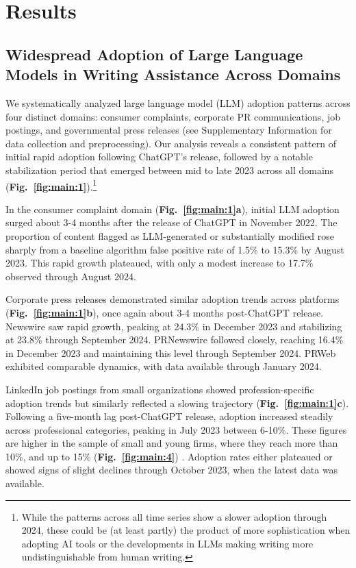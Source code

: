

\section*{Results}
\label{sec:Results}

\subsection*{Widespread Adoption of Large Language Models in Writing Assistance Across Domains}



We systematically analyzed large language model (LLM) adoption patterns across four distinct domains: consumer complaints, corporate PR communications, job postings, and governmental press releases (see Supplementary Information for data collection and preprocessing). Our analysis reveals a consistent pattern of initial rapid adoption following ChatGPT's release, followed by a notable stabilization period that emerged between mid to late 2023 across all domains (\textbf{Fig.~\ref{fig:main:1}}).\footnote{While the patterns across all time series show a slower adoption through 2024, these could be (at least partly) the product of more sophistication when adopting AI tools or the developments in LLMs making writing more undistinguishable from human writing.}



In the consumer complaint domain (\textbf{Fig.~\ref{fig:main:1}a}), initial LLM adoption surged about 3-4 months after the release of ChatGPT in November 2022. The proportion of content flagged as LLM-generated or substantially modified rose sharply from a baseline algorithm false positive rate of 1.5\% to 15.3\% by August 2023. This rapid growth plateaued, with only a modest increase to 17.7\% observed through August 2024.

Corporate press releases demonstrated similar adoption trends across platforms (\textbf{Fig.~\ref{fig:main:1}b}), once again about 3-4 months post-ChatGPT release. Newswire saw rapid growth, peaking at 24.3\% in December 2023 and stabilizing at 23.8\% through September 2024. PRNewswire followed closely, reaching 16.4\% in December 2023 and maintaining this level through September 2024. PRWeb exhibited comparable dynamics, with data available through January 2024.


LinkedIn job postings from small organizations showed profession-specific adoption trends but similarly reflected a slowing trajectory (\textbf{Fig.~\ref{fig:main:1}c}). Following a five-month lag post-ChatGPT release, adoption increased steadily across professional categories, peaking in July 2023 between 6-10\%. These figures are higher in the sample of small and young firms, where they reach more than 10\%, and up to 15\% (\textbf{Fig.~\ref{fig:main:4}})
. Adoption rates either plateaued or showed signs of slight declines through October 2023, when the latest data was available. 

